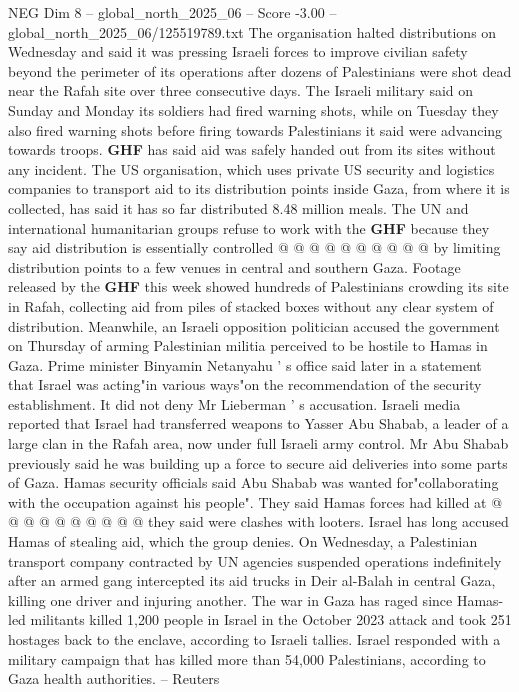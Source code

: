 \begin{textsample}{NEG Dim 8 – global\_north\_2025\_06 – Score -3.00 – global\_north\_2025\_06/125519789.txt}
The organisation halted distributions on Wednesday and said it was pressing Israeli forces to improve civilian safety beyond the perimeter of its operations after dozens of Palestinians were shot dead near the Rafah site over three consecutive days.
The Israeli military said on Sunday and Monday its soldiers had fired warning shots, while on Tuesday they also fired warning shots before firing towards Palestinians it said were advancing towards troops. \textbf{GHF} has said aid was safely handed out from its sites without any incident.
The US organisation, which uses private US security and logistics companies to transport aid to its distribution points inside Gaza, from where it is collected, has said it has so far distributed 8.48 million meals.
The UN and international humanitarian groups refuse to work with the \textbf{GHF} because they say aid distribution is essentially controlled @ @ @ @ @ @ @ @ @ @ by limiting distribution points to a few venues in central and southern Gaza.
Footage released by the \textbf{GHF} this week showed hundreds of Palestinians crowding its site in Rafah, collecting aid from piles of stacked boxes without any clear system of distribution.
Meanwhile, an Israeli opposition politician accused the government on Thursday of arming Palestinian militia perceived to be hostile to Hamas in Gaza.
Prime minister Binyamin Netanyahu ' s office said later in a statement that Israel was acting"in various ways"on the recommendation of the security establishment.
It did not deny Mr Lieberman ' s accusation.
Israeli media reported that Israel had transferred weapons to Yasser Abu Shabab, a leader of a large clan in the Rafah area, now under full Israeli army control.
Mr Abu Shabab previously said he was building up a force to secure aid deliveries into some parts of Gaza.
Hamas security officials said Abu Shabab was wanted for"collaborating with the occupation against his people".
They said Hamas forces had killed at @ @ @ @ @ @ @ @ @ @ they said were clashes with looters.
Israel has long accused Hamas of stealing aid, which the group denies.
On Wednesday, a Palestinian transport company contracted by UN agencies suspended operations indefinitely after an armed gang intercepted its aid trucks in Deir al-Balah in central Gaza, killing one driver and injuring another.
The war in Gaza has raged since Hamas-led militants killed 1,200 people in Israel in the October 2023 attack and took 251 hostages back to the enclave, according to Israeli tallies.
Israel responded with a military campaign that has killed more than 54,000 Palestinians, according to Gaza health authorities. -- Reuters

\end{textsample}
